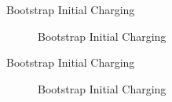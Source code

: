 \begin{frame}{Bootstrap Initial Charging}
	\begin{figure}
		\centering


		\caption{Bootstrap Initial Charging}
	\end{figure}
\end{frame}


\begin{frame}{Bootstrap Initial Charging}
	\begin{figure}
		\centering


		\caption{Bootstrap Initial Charging}
	\end{figure}
\end{frame}

